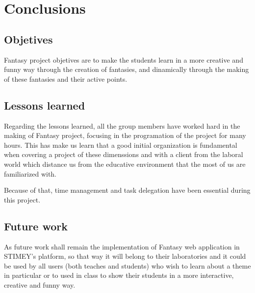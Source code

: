 \chapter{Conclusions}
\section{Objetives}
Fantasy project objetives are to make the students learn in a more creative and funny way through the creation of fantasies, and dinamically through the making of these fantasies and their active points.

\section{Lessons learned}
Regarding the lessons learned, all the group members have worked hard in the making of Fantasy project, focusing in the programation of the project for many hours. This has make us learn that a good initial organization is fundamental when covering a project of these dimenssions and with a client from the laboral world which distance us from the educative environment that the most of us are familiarized with.

Because of that, time management and task delegation have been essential during this project. 

\section{Future work}
As future work shall remain the implementation of Fantasy web application in STIMEY's platform, so that way it will belong to their laboratories and it could be used by all users (both teaches and students) who wish to learn about a theme in particular or to used in class to show their students in a more interactive, creative and funny way.